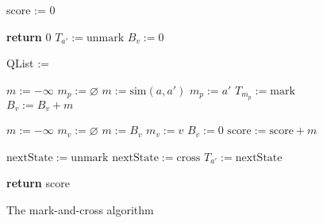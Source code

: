 \begin{figure}
\begin{algorithmic}[1]

\State score := 0

\State \textbf{return} 0 
\EndIf
{}
\State $T_{a'} := \mathrm{unmark}$ 
\EndFor
{}
\State $B_v := 0$ 
\EndFor

\State QList := 


\State $m := -\infty$
\State $m_p := \varnothing$
\State $m := \mathrm{sim}(a, a')$ 
\State $m_p := a'$ 
\EndIf
\EndFor
{}
\State $T_{m_p} := \mathrm{mark}$ 
\State $B_v := B_v + m$
\EndIf
\EndFor

\label{line_bond_finish}

\State $m := -\infty$
\State $m_v := \varnothing $
\State $m := B_v$ 
\State $m_v := v$ 
\EndIf
\State $B_v := 0$ 
\EndFor
\State $\mathrm{score} := \mathrm{score} + m$ 

\State $\mathrm{nextState} := \mathrm{unmark}$ 
\Else
\State $\mathrm{nextState} := \mathrm{cross}$ 
\EndIf
{}
\State $T_{a'} := \mathrm{nextState}$ 
\EndIf
\EndFor
\EndFor

\EndIf

\EndFor

\State \textbf{return} score
\EndProcedure

\end{algorithmic}
\caption{The mark-and-cross algorithm}\label{markcrossalgo}
\end{figure}

